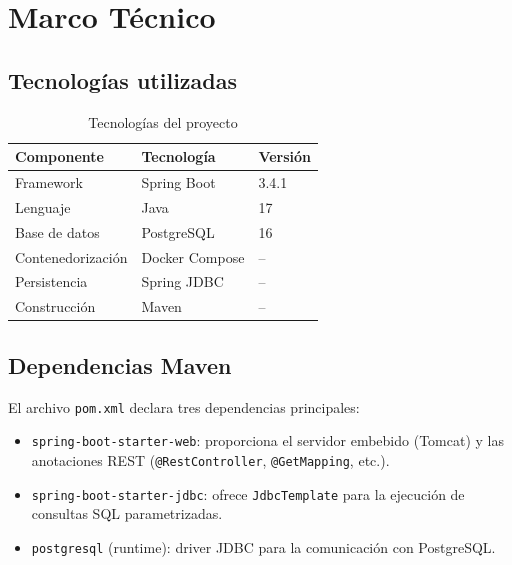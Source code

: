 \documentclass[12pt, a4paper]{article}
\begin{document}
\section{Marco Técnico}

\subsection{Tecnologías utilizadas}

\begin{table}[H]
\centering
\caption{Tecnologías del proyecto}
\begin{tabular}{@{} l l l @{}}
\toprule
\textbf{Componente} & \textbf{Tecnología} & \textbf{Versión} \\
\midrule
Framework & Spring Boot & 3.4.1 \\
Lenguaje & Java & 17 \\
Base de datos & PostgreSQL & 16 \\
Contenedorización & Docker Compose & -- \\
Persistencia & Spring JDBC & -- \\
Construcción & Maven & -- \\
\bottomrule
\end{tabular}
\end{table}

\subsection{Dependencias Maven}
El archivo \texttt{pom.xml} declara tres dependencias principales:
\begin{itemize}
  \item \texttt{spring-boot-starter-web}: proporciona el servidor embebido (Tomcat) y las anotaciones REST (\texttt{@RestController}, \texttt{@GetMapping}, etc.).
  \item \texttt{spring-boot-starter-jdbc}: ofrece \texttt{JdbcTemplate} para la ejecución de consultas SQL parametrizadas.
  \item \texttt{postgresql} (runtime): driver JDBC para la comunicación con PostgreSQL.
\end{itemize}

\end{document}
